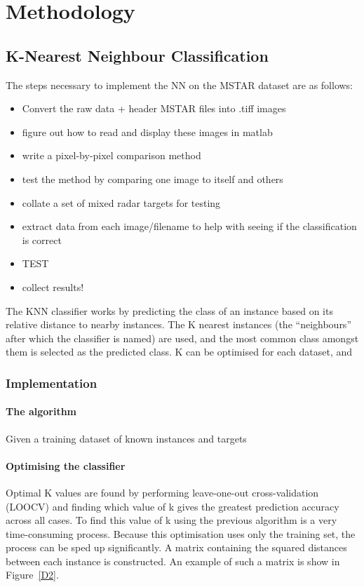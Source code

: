 \chapter{Methodology}
\section{K-Nearest Neighbour Classification}
The steps necessary to implement the NN on the MSTAR dataset are as follows:\\

\begin{itemize}
\item Convert the raw data + header MSTAR files into .tiff images
\item figure out how to read and display these images in matlab
\item write a pixel-by-pixel comparison method
\item test the method by comparing one image to itself and others
\item collate a set of mixed radar targets for testing
\item extract data from each image/filename to help with seeing if the classification is correct
\item TEST
\item collect results!
\end{itemize}




The KNN classifier works by predicting the class of an instance based on its relative distance to nearby instances. The K nearest instances (the ``neighbours'' after which the classifier is named) are used, and the most common class amongst them is selected as the predicted class. K can be optimised for each dataset, and 

\subsection{Implementation}
\subsubsection{The algorithm}
Given a training dataset of known instances and targets
\subsubsection{Optimising the classifier}
Optimal K values are found by performing leave-one-out cross-validation (LOOCV) and finding which value of k gives the greatest prediction accuracy across all cases. To find this value of k using the previous algorithm is a very time-consuming process. Because this optimisation uses only the training set, the process can be sped up significantly. A matrix containing the squared distances between each instance is constructed. An example of such a matrix is show in Figure~\ref{D2}.



